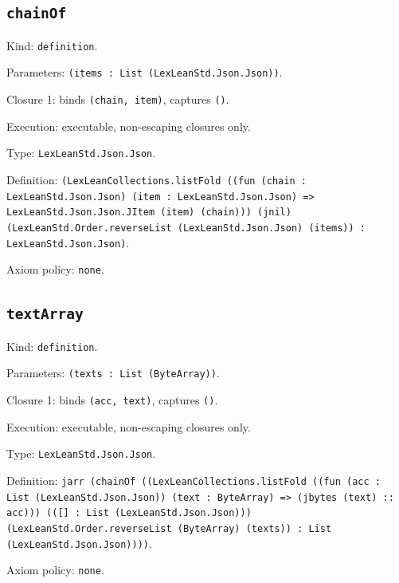 \documentclass[11pt]{article}
\begin{document}
\subsection*{\texttt{chainOf}}
\noindent Kind: \texttt{definition}.\par
\noindent Parameters: \texttt{(items : List (LexLeanStd.Json.Json))}.\par
\noindent Closure 1: binds \texttt{(chain, item)}, captures \texttt{()}.\par
\noindent Execution: executable, non-escaping closures only.\par
\noindent Type: \texttt{LexLeanStd.Json.Json}.\par
\noindent Definition: \texttt{(LexLeanCollections.listFold ((fun (chain : LexLeanStd.Json.Json) (item : LexLeanStd.Json.Json) => LexLeanStd.Json.Json.JItem (item) (chain))) (jnil) (LexLeanStd.Order.reverseList (LexLeanStd.Json.Json) (items)) : LexLeanStd.Json.Json)}.\par
\noindent Axiom policy: \texttt{none}.\par
\subsection*{\texttt{textArray}}
\noindent Kind: \texttt{definition}.\par
\noindent Parameters: \texttt{(texts : List (ByteArray))}.\par
\noindent Closure 1: binds \texttt{(acc, text)}, captures \texttt{()}.\par
\noindent Execution: executable, non-escaping closures only.\par
\noindent Type: \texttt{LexLeanStd.Json.Json}.\par
\noindent Definition: \texttt{jarr (chainOf ((LexLeanCollections.listFold ((fun (acc : List (LexLeanStd.Json.Json)) (text : ByteArray) => (jbytes (text) :: acc))) (([] : List (LexLeanStd.Json.Json))) (LexLeanStd.Order.reverseList (ByteArray) (texts)) : List (LexLeanStd.Json.Json))))}.\par
\noindent Axiom policy: \texttt{none}.\par
\end{document}
